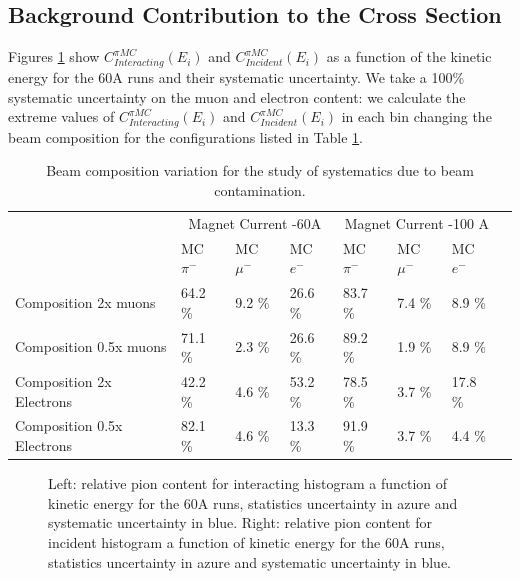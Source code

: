 \subsection{Background Contribution to the Cross Section}\label{sec:Correction}

Figures \ref{fig:CorrectionsBeam} show $C^{\pi MC}_{Interacting} (E_{i})$ and $C^{\pi MC}_{Incident} (E_{i})$ as a function of the kinetic energy for the 60A runs and their systematic uncertainty.  We take a 100\% systematic uncertainty on the muon and electron content: we calculate the extreme values of  $C^{\pi MC}_{Interacting} (E_{i})$ and $C^{\pi MC}_{Incident} (E_{i})$ in each bin changing the beam composition for the configurations listed in Table \ref{tab:beamlineSys}.



\begin{table}[p]
\centering
\begin{tabular}{| l | l | l | l | l | l | l | l | }
\hline
 &  \multicolumn{3}{|c|}{Magnet Current -60A} & \multicolumn{3}{|c|}{Magnet Current -100 A}\\

                                                  & MC $\pi^-$   & MC  $ \mu^-$ & MC  $e^-$ & MC  $\pi^-$ & MC  $\mu^-$ & MC  $e^-$  \\
\hline
Composition 2x muons          & 64.2	\%&9.2 \%&	26.6 \%&	83.7 \%&	7.4	\%&8.9 \% \\
Composition 0.5x muons       &71.1	\%&2.3 \%&	26.6 \%&	89.2 \%&	1.9	\%&8.9 \% \\
Composition 2x Electrons      &42.2	\%&4.6 \%&	53.2 \%&	78.5	\%&  3.7	\%&17.8 \%\\
Composition 0.5x Electrons   &82.1	\%&4.6 \%&	13.3 \%&	91.9 \%&	3.7	\%&4.4 \% \\
\hline
\end{tabular}
\caption{Beam composition variation for the study of systematics due to beam contamination.}
\label{tab:beamlineSys}
\end{table}

\begin{figure}[p]
\centering
\caption{Left: relative pion content for interacting histogram a function of kinetic energy for the 60A runs, statistics uncertainty in azure and systematic uncertainty in blue. Right: relative pion content  for incident histogram a function of kinetic energy for the 60A runs, statistics uncertainty in azure and systematic uncertainty in blue.}
\label{fig:CorrectionsBeam}
\end{figure}

